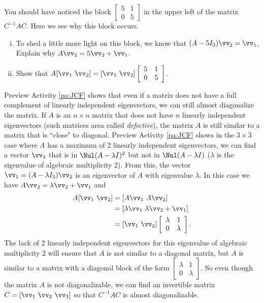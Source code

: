 \begin{pa}
\item You should have noticed the block $\left[ \begin{array}{cc} 5&1 \\ 0&5 \end{array} \right]$ in the upper left of the matrix $C^{-1}AC$. Here we see why this block occurs. 
	\begin{enumerate}[i.]
	\item To shed a little more light on this block, we know that $(A - 5 I_3) \vv_2 = \vv_1$. Explain why $A \vv_2 =  5 \vv_2 + \vv_1$. 

	\item Show that $A[\vv_1 \ \vv_2] = [\vv_1 \ \vv_2] \left[ \begin{array}{cc} 5&1 \\ 0&5   \end{array} \right]$.
	
	\end{enumerate}
	

\ea

\end{pa}


Preview Activity \ref{pa:JCF} shows that even if a matrix does not have a full complement of linearly independent eigenvectors, we can still almost diagonalize the matrix. If $A$ is an $n \times n$ matrix that does not have $n$ linearly independent eigenvectors (such matrices area called \emph{defective}), the matrix $A$ is still similar to a matrix that is ``close" to diagonal. Preview Activity \ref{pa:JCF} shows in the $3 \times 3$ case where $A$ has a maximum of 2 linearly independent eigenvectors, we can find a vector $\vv_2$ that is in $\Nul (A - \lambda I)^2$ but not in $\Nul (A-\lambda I)$ ($\lambda$ is the eigenvalue of algebraic multiplicity 2). From this, the vector $\vv_1 = (A - \lambda I_3) \vv_2$ is an eigenvector of $A$ with eigenvalue $\lambda$. In this case we have $A \vv_2 = \lambda \vv_2 + \vv_1$ and 
\begin{align*}
A [\vv_1 \ \vv_2] &= [A\vv_1 \ A\vv_2] \\
	&= [\lambda \vv_1 \ \lambda \vv_2+\vv_1 ] \\
	&= [\vv_1  \ \vv_2]  \left[ \begin{array}{cc} \lambda &1 \\ 0 & \lambda \end{array} \right].
\end{align*}
The lack of 2 linearly independent eigenvectors for this eigenvalue of algebraic multiplicity 2 will ensure that $A$ is not similar to a diagonal matrix, but $A$ is similar to a matrix with a diagonal block of the form $\left[ \begin{array}{cc} \lambda &1 \\ 0 & \lambda \end{array} \right]$. So even though the matrix $A$ is not diagonalizable, we can find an invertible matrix $C = [\vv_1 \ \vv_2 \ \vv_3]$ so that $C^{-1}AC$ is almost diagonalizable. 

